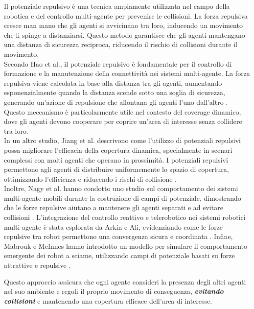 \documentclass[twoside]{article}
\begin{document}
Il potenziale repulsivo è una tecnica ampiamente utilizzata nel campo della robotica e del controllo multi-agente per prevenire le collisioni. La forza repulsiva cresce man mano che gli agenti si avvicinano tra loro, inducendo un movimento che li spinge a distanziarsi. Questo metodo garantisce che gli agenti mantengano una distanza di sicurezza reciproca, riducendo il rischio di collisioni durante il movimento.\\
Secondo Hao et al., il potenziale repulsivo è fondamentale per il controllo di formazione e la manutenzione della connettività nei sistemi multi-agente. La forza repulsiva viene calcolata in base alla distanza tra gli agenti, aumentando esponenzialmente quando la distanza scende sotto una soglia di sicurezza, generando un'azione di repulsione che allontana gli agenti l'uno dall'altro \cite{MDPI_Hao}. Questo meccanismo è particolarmente utile nel contesto del coverage dinamico, dove gli agenti devono cooperare per coprire un'area di interesse senza collidere tra loro.\\
In un altro studio, Jiang et al. descrivono come l'utilizzo di potenziali repulsivi possa migliorare l'efficacia della copertura dinamica, specialmente in scenari complessi con molti agenti che operano in prossimità. I potenziali repulsivi permettono agli agenti di distribuire uniformemente lo spazio di copertura, ottimizzando l'efficienza e riducendo i rischi di collisione \cite{MDPI_Jiang}.\\
Inoltre, Nagy et al. hanno condotto uno studio sul comportamento dei sistemi multi-agente mobili durante la costruzione di campi di potenziale, dimostrando che le forze repulsive aiutano a mantenere gli agenti separati e ad evitare collisioni \cite{Nagy2009}. L'integrazione del controllo reattivo e telerobotico nei sistemi robotici multi-agente è stata esplorata da Arkin e Ali, evidenziando come le forze repulsive tra robot permettono una convergenza sicura e coordinata \cite{Arkin1994}. Infine, Mabrouk e McInnes hanno introdotto un modello per simulare il comportamento emergente dei robot a sciame, utilizzando campi di potenziale basati su forze attrattive e repulsive \cite{Mabrouk2008}.

\vspace{\baselineskip}

Questo approccio assicura che ogni agente consideri la presenza degli altri agenti nel suo ambiente e regoli il proprio movimento di conseguenza, \textit{\textbf{evitando collisioni}} e mantenendo una copertura efficace dell'area di interesse.
\end{document}
